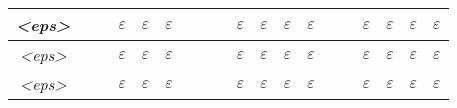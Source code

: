 \documentclass[10pt,a1paper]{memoir}
\begin{document}
\begin{center}
\begin{tabular}{ |c||c|c|c|c|c|c|c|c|c|c|c|c|c|c|c|c|c|c| }
\textsl{\textless eps\textgreater} &  &  & $\varepsilon$ & $\varepsilon$ & $\varepsilon$ &  &  &  & $\varepsilon$ & $\varepsilon$ & $\varepsilon$ & $\varepsilon$ &  &  & $\varepsilon$ & $\varepsilon$ & $\varepsilon$ & $\varepsilon$\\ \hline
\textsl{\textless eps\textgreater} &  &  & $\varepsilon$ & $\varepsilon$ & $\varepsilon$ &  &  &  & $\varepsilon$ & $\varepsilon$ & $\varepsilon$ & $\varepsilon$ &  &  & $\varepsilon$ & $\varepsilon$ & $\varepsilon$ & $\varepsilon$\\ \hline
\textsl{\textless eps\textgreater} &  &  & $\varepsilon$ & $\varepsilon$ & $\varepsilon$ &  &  &  & $\varepsilon$ & $\varepsilon$ & $\varepsilon$ & $\varepsilon$ &  &  & $\varepsilon$ & $\varepsilon$ & $\varepsilon$ & $\varepsilon$\\
\hline
\end{tabular}

\end{center}
\end{document}
